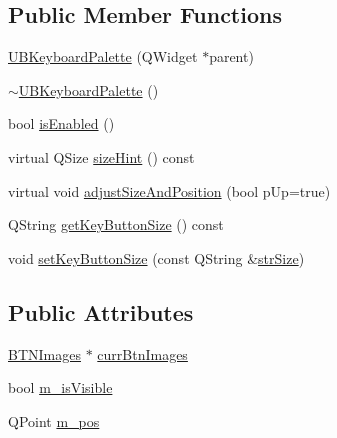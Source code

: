 \subsection*{Public Member Functions}
\begin{DoxyCompactItemize}
\item 
\hyperlink{class_u_b_keyboard_palette_aa37fa74f921fa125b304707b858c4d24}{U\-B\-Keyboard\-Palette} (Q\-Widget $\ast$parent)
\item 
\hyperlink{class_u_b_keyboard_palette_a8080bfaa362d0bd82d34da529393d9c9}{$\sim$\-U\-B\-Keyboard\-Palette} ()
\item 
bool \hyperlink{class_u_b_keyboard_palette_a019b23bc185e014451a2b020b9c286c7}{is\-Enabled} ()
\item 
virtual Q\-Size \hyperlink{class_u_b_keyboard_palette_a0753b0ec9b10e348b8a531a72ad10149}{size\-Hint} () const 
\item 
virtual void \hyperlink{class_u_b_keyboard_palette_a9ca20112f36af4cfa66a792c23eb6a64}{adjust\-Size\-And\-Position} (bool p\-Up=true)
\item 
Q\-String \hyperlink{class_u_b_keyboard_palette_a5957b5bdbf26446d146347c35c60207a}{get\-Key\-Button\-Size} () const 
\item 
void \hyperlink{class_u_b_keyboard_palette_a289f55c2084f9c084006b5db4b463c6f}{set\-Key\-Button\-Size} (const Q\-String \&\hyperlink{class_u_b_keyboard_palette_a74a528e1583463f1c68553ae1b4d4ccc}{str\-Size})
\end{DoxyCompactItemize}
\subsection*{Public Attributes}
\begin{DoxyCompactItemize}
\item 
\hyperlink{class_b_t_n_images}{B\-T\-N\-Images} $\ast$ \hyperlink{class_u_b_keyboard_palette_a9d0abd15cff143a07e6af72ef606e3bd}{curr\-Btn\-Images}
\item 
bool \hyperlink{class_u_b_keyboard_palette_af8d731f629b8476184064ca887a6f5fb}{m\-\_\-is\-Visible}
\item 
Q\-Point \hyperlink{class_u_b_keyboard_palette_acaac045d872cd85602623a0c7c65d4c7}{m\-\_\-pos}
\end{DoxyCompactItemize}
